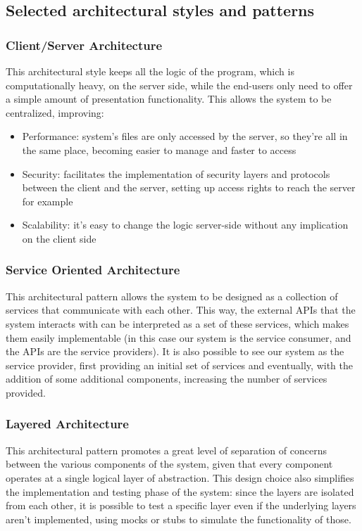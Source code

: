 \documentclass[12pt]{article}
\begin{document}
\subsection{Selected architectural styles and patterns}

\subsubsection{Client/Server Architecture} This architectural style keeps all the logic of the program, which is computationally heavy, on the server side, while the end-users only need to offer a simple amount of presentation functionality. This allows the system to be centralized, improving:
\begin{itemize}
    \item Performance: system's files are only accessed by the server, so they're all in the same place, becoming easier to manage and faster to access
    \item Security: facilitates the implementation of security layers and protocols between the client and the server, setting up access rights to reach the server for example
    \item Scalability: it's easy to change the logic server-side without any implication on the client side
\end{itemize}

\subsubsection{Service Oriented Architecture} This architectural pattern allows the system to be designed as a collection of services that communicate with each other. This way, the external APIs that the system interacts with can be interpreted as a set of these services, which makes them easily implementable (in this case our system is the service consumer, and the APIs are the service providers). It is also possible to see our system as the service provider, first providing an initial set of services and eventually, with the addition of some additional components, increasing the number of services provided.

\subsubsection{Layered Architecture} This architectural pattern promotes a great level of separation of concerns between the various components of the system, given that every component operates at a single logical layer of abstraction. This design choice also simplifies the implementation and testing phase of the system: since the layers are isolated from each other, it is possible to test a specific layer even if the underlying layers aren't implemented, using mocks or stubs to simulate the functionality of those.
\end{document}

